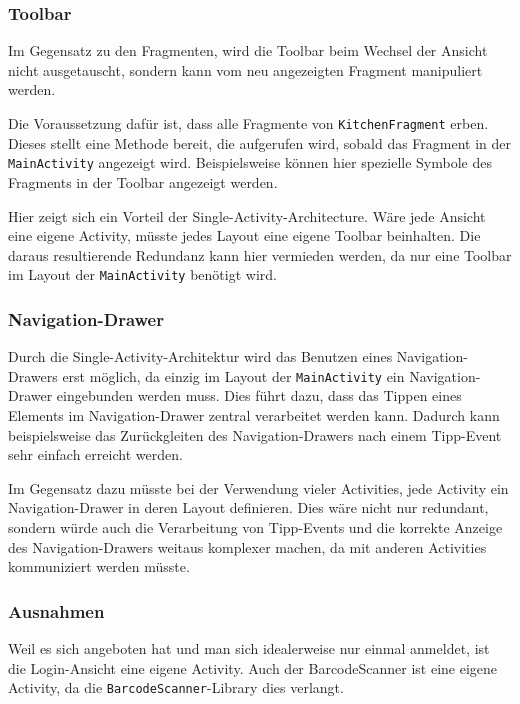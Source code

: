 
\subsubsection{Toolbar}

Im Gegensatz zu den Fragmenten, wird die Toolbar beim Wechsel der Ansicht nicht ausgetauscht, sondern kann vom neu angezeigten Fragment manipuliert werden.

Die Voraussetzung dafür ist, dass alle Fragmente von \texttt{KitchenFragment} erben.
Dieses stellt eine Methode bereit, die aufgerufen wird, sobald das Fragment in der \texttt{MainActivity} angezeigt wird.
Beispielsweise können hier spezielle Symbole des Fragments in der Toolbar angezeigt werden.

Hier zeigt sich ein Vorteil der Single-Activity-Architecture.
Wäre jede Ansicht eine eigene Activity, müsste jedes Layout eine eigene Toolbar beinhalten.
Die daraus resultierende Redundanz kann hier vermieden werden, da nur eine Toolbar im Layout der \texttt{MainActivity} benötigt wird.

\subsubsection{Navigation-Drawer}

Durch die Single-Activity-Architektur wird das Benutzen eines Navigation-Drawers erst möglich, da einzig im Layout der \texttt{MainActivity} ein Navigation-Drawer eingebunden werden muss.
Dies führt dazu, dass das Tippen eines Elements im Navigation-Drawer zentral verarbeitet werden kann.
Dadurch kann beispielsweise das Zurückgleiten des Navigation-Drawers nach einem Tipp-Event sehr einfach erreicht werden.

Im Gegensatz dazu müsste bei der Verwendung vieler Activities, jede Activity ein Navigation-Drawer in deren Layout definieren.
Dies wäre nicht nur redundant, sondern würde auch die Verarbeitung von Tipp-Events und die korrekte Anzeige des Navigation-Drawers weitaus komplexer machen, da mit anderen Activities kommuniziert werden müsste.

\subsubsection{Ausnahmen}

Weil es sich angeboten hat und man sich idealerweise nur einmal anmeldet, ist die Login-Ansicht eine eigene Activity.
Auch der BarcodeScanner ist eine eigene Activity, da die \texttt{BarcodeScanner}-Library dies verlangt.

